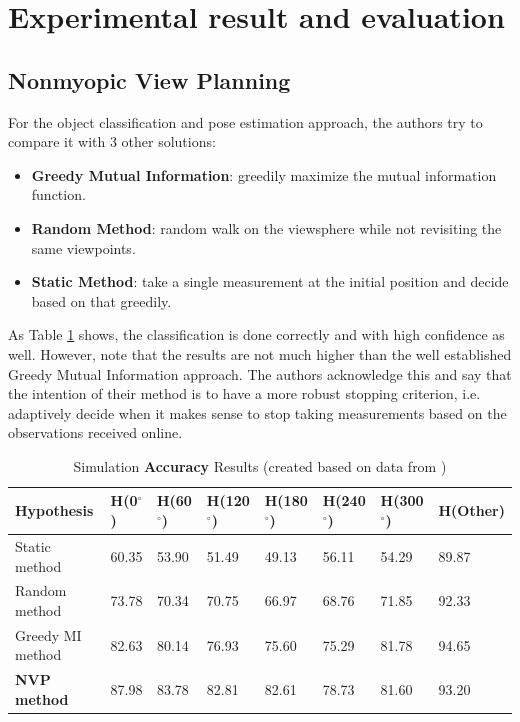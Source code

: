 \documentclass[a4paper,11pt,english]{article}
\begin{document}
\section{Experimental result and evaluation}




\subsection{Nonmyopic View Planning}



For the object classification and pose estimation approach, the authors try to compare it with 3 other solutions:
\begin{itemize}
\item \textbf{Greedy Mutual Information}: greedily maximize the mutual information function.
\item \textbf{Random Method}: random walk on the viewsphere while not revisiting the same viewpoints.
\item \textbf{Static Method}: take a single measurement at the initial position and decide based on that greedily. 
\end{itemize}

As Table \ref{tbl:atanasovsimevaluation1} shows, the classification is done correctly and with high confidence as well. However, note that the results are not much higher than the well established Greedy Mutual Information approach. The authors acknowledge this and say that the intention of their method is to have a more robust stopping criterion, i.e. adaptively decide when it makes sense to stop taking measurements based on the observations received online. 

\begin{table}[t!]
  \caption{Simulation \textbf{Accuracy} Results (created based on data from \cite{atanasov2014nonmyopic})}
  \label{tbl:atanasovsimevaluation1}
	\begin{adjustbox}{width=\columnwidth,center}
     \begin{tabular}{|l|l|l|l|l|l|l|l|}
     \hline
   Hypothesis & H(0$^\circ$)& H(60$^\circ$) & H(120$^\circ$) & H(180$^\circ$) & H(240$^\circ$) & H(300$^\circ$) & H(Other)\\
   \hline
  Static method & 60.35 & 53.90 & 51.49 & 49.13 & 56.11 & 54.29 & 89.87 \\


  Random method & 73.78 & 70.34 & 70.75 & 66.97 & 68.76 & 71.85 & 92.33 \\


  Greedy MI method & 82.63 & 80.14 & 76.93 & 75.60 & 75.29 & 81.78 & 94.65 \\


  \textbf{NVP method} & 87.98 & 83.78 & 82.81 & 82.61 & 78.73 & 81.60 & 93.20 \\
\hline
	
\end{tabular}  
\end{adjustbox} 
  
\end{table}
\end{document}
